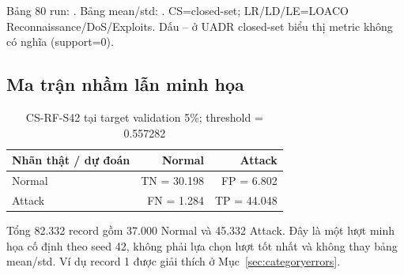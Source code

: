 \documentclass[12pt,a4paper,oneside]{report}
\begin{document}
Bảng 80 run: . Bảng mean/std: . CS=closed-set; LR/LD/LE=LOACO Reconnaissance/DoS/Exploits. Dấu -- ở UADR closed-set biểu thị metric không có nghĩa (support=0).

\subsection{Ma trận nhầm lẫn minh họa}
\begin{table}[H]\centering\small
\caption{CS-RF-S42 tại target validation 5\%; threshold = 0.557282}\label{tab:confusion}
\begin{tabular}{lrr}\toprule
Nhãn thật / dự đoán & Normal & Attack\\\midrule
Normal & TN = 30.198 & FP = 6.802\\
Attack & FN = 1.284 & TP = 44.048\\\bottomrule
\end{tabular}\end{table}
Tổng 82.332 record gồm 37.000 Normal và 45.332 Attack. Đây là một lượt minh họa cố định theo seed 42, không phải lựa chọn lượt tốt nhất và không thay bảng mean/std. Ví dụ record 1 được giải thích ở Mục~\ref{sec:categoryerrors}.
\end{document}
